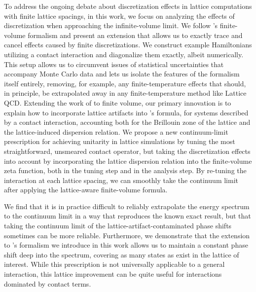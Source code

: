 To address the ongoing debate \todo{\cite{}} about discretization effects in lattice computations with finite lattice spacings, in this work, we focus on analyzing the effects of discretization when approaching the infinite-volume limit.
We follow \Luscher's finite-volume formalism and present an extension that allows us to exactly trace and cancel effects caused by finite discretizations.
We construct example Hamiltonians utilizing a contact interaction and diagonalize them exactly, albeit numerically.
This setup allows us to circumvent issues of statistical uncertainties that accompany Monte Carlo data and lets us isolate the features of the formalism itself entirely, removing, for example, any finite-temperature effects that should, in principle, be extrapolated away in any finite-temperature method like Lattice QCD.
Extending the work of  to finite volume, our primary innovation is to explain how to incorporate lattice artifacts into \Luscher's formula, for systems described by a contact interaction, accounting both for the Brillouin zone of the lattice and the lattice-induced dispersion relation.
We propose a new continuum-limit prescription for achieving unitarity in lattice simulations by tuning the most straightforward, unsmeared contact operator, but taking the discretization effects into account by incorporating the lattice dispersion relation into the finite-volume zeta function, both in the tuning step and in the analysis step.
By re-tuning the interaction at each lattice spacing, we can smoothly take the continuum limit after applying the lattice-aware finite-volume formula.

We find that it is in practice difficult to reliably extrapolate the energy spectrum to the continuum limit in a way that reproduces the known exact result, but that taking the continuum limit of the lattice-artifact-contaminated phase shifts sometimes can be more reliable.
Furthermore, we demonstrate that the extension to \Luscher's formalism we introduce in this work allows us to maintain a constant phase shift deep into the spectrum, covering as many \Aoneg states as exist in the lattice of interest.
While this prescription is not universally applicable to a general interaction, this lattice improvement can be quite useful for interactions dominated by contact terms.

